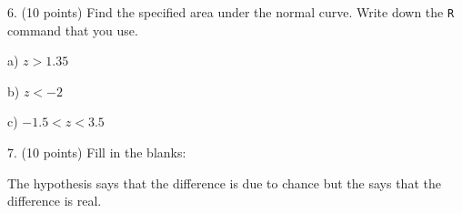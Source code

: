 \documentclass[10pt]{article}
\begin{document}
\vfill
\eject

6. (10 points) Find the specified area under the normal curve.  Write down the \texttt{R} command that you use.

\hspace{10pt} a) $z>1.35$ 
\bigskip
\bigskip\bigskip\bigskip

\hspace{10pt} b) $z<-2$
\bigskip
\bigskip\bigskip\bigskip

\hspace{10pt} c) $-1.5 < z < 3.5$
\bigskip\bigskip\bigskip\bigskip

7. (10 points)  
Fill in the blanks: 
\bigskip

The \underline{\hspace{60pt}} hypothesis says that the difference is due to chance
but the \underline{\hspace{60pt}} says that the difference is real.  
\vfill
\end{document}
